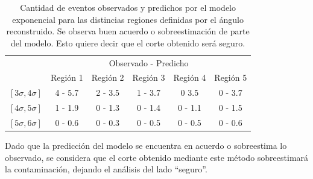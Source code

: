 	\begin{table}[h!]
	\begin{center}
		\renewcommand{\arraystretch}{1.4}
		\footnotesize
	 \begin{tabular}{|c|c|c|c|c|c|}
	 \hline
	 & \multicolumn{5}{c|}{Observado - Predicho} \\
	 & Región 1 & Región 2 & Región 3 & Región 4 & Región 5 \\
	 \hline
	 $[3\sigma, 4\sigma]$ & 4 - 5.7 &2 - 3.5 & 1 - 3.7 & 0 3.5 & 0 - 3.7 \\
	 $[4\sigma, 5\sigma]$ & 1 - 1.9 & 0 - 1.3 & 0 - 1.4 & 0 - 1.1 & 0 - 1.5 \\
	 $[5\sigma, 6\sigma]$ & 0 - 0.6 & 0 - 0.3 & 0 - 0.5 & 0 - 0.5 & 0 - 0.6 \\
	 \hline
	 \end{tabular}
	 \caption{Cantidad de eventos observados y predichos por el modelo exponencial para las distincias regiones definidas por el ángulo reconstruido. Se observa buen acuerdo o sobreestimación de parte del modelo. Esto quiere decir que el corte obtenido será seguro.}
	 \label{tab:predDGL}
	\end{center}
	\end{table}
	Dado que la predicción del modelo se encuentra en acuerdo o sobreestima lo observado, se considera que el corte obtenido mediante este método sobreestimará la contaminación, dejando el análisis del lado ``seguro''.
	
